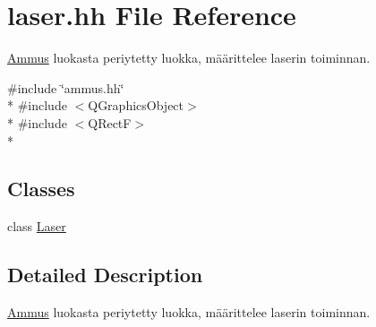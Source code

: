 \hypertarget{laser_8hh}{\section{laser.\-hh File Reference}
\label{laser_8hh}
}


\hyperlink{class_ammus}{Ammus} luokasta periytetty luokka, määrittelee laserin toiminnan.  


{\ttfamily \#include \char`\"{}ammus.\-hh\char`\"{}}\\*
{\ttfamily \#include $<$Q\-Graphics\-Object$>$}\\*
{\ttfamily \#include $<$Q\-Rect\-F$>$}\\*
\subsection*{Classes}
\begin{DoxyCompactItemize}
\item 
class \hyperlink{class_laser}{Laser}
\end{DoxyCompactItemize}


\subsection{Detailed Description}
\hyperlink{class_ammus}{Ammus} luokasta periytetty luokka, määrittelee laserin toiminnan. 